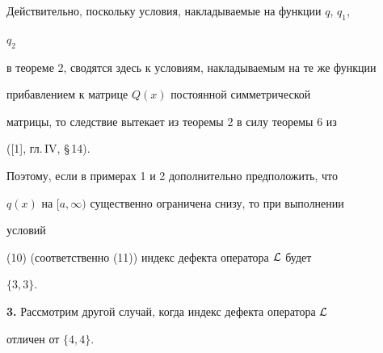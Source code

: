  


Действительно, поскольку условия, накладываемые на функции $q$, $q_1$, 


$q_2$ 


в теореме 2, сводятся здесь к условиям, накладываемым на те же функции 


прибавлением к матрице $Q(x)$ постоянной симметрической 


матрицы, то следствие вытекает из теоремы 2 в силу теоремы 6 из 


([1], гл.\,IV, \S\,14). 


 


Поэтому, если в примерах 1 и 2 дополнительно предположить, что 


$q(x)$ на $[a,\infty)$ существенно ограничена снизу, то при выполнении 


условий 


(10) (соответственно (11)) индекс дефекта оператора $\cal L$ будет 


$\{3,3\}$. 


\medskip 


 


{\bf 3.} Рассмотрим другой случай, когда индекс дефекта оператора $\cal 


L$ 


отличен от $\{4,4\}$. 


 


